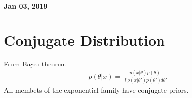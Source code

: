 \documentclass[11pt]{article}
\begin{document}
%

\newcommand{\Ito}{$It\hat{o}$'$s~Lemma$}

\newcommand\ind{\stackrel{\rm ind}{\sim}}
\newcommand\iid{\stackrel{\rm iid}{\sim}}
\renewcommand\c{\mathbf{c}}
\newcommand\y{\mathbf{y}}
\newcommand\z{\mathbf{z}}
\renewcommand\P{\mathbf{P}}
\newcommand\W{\mathbf{W}}
\newcommand\X{\mathbf{X}}
\newcommand\Y{\mathbf{Y}}
\newcommand\Z{\mathbf{Z}}
\newcommand\J{{\cal J}}
\newcommand\B{{\cal B}}
\newcommand\K{{\cal K}}
\newcommand\N{{\rm N}}
\newcommand\bs{\boldsymbol}
\newcommand\bth{\bs\theta}
\newcommand\bbe{\bs\beta}
\renewcommand\*{^\star}

\def\spacingset#1{\renewcommand{\baselinestretch}%
{#1}\small\normalsize} \spacingset{1}



  \bigskip
  \bigskip
  \bigskip
  \begin{center}
    {\LARGE\bf Jan 03, 2019 }
  \end{center}
  \medskip



\spacingset{1.45}







\section{Conjugate Distribution} 

From Bayes theorem
  \begin{align}
    p(\theta | x) = \frac{p(x|\theta)p(\theta)}{\int p(x|\theta')p(\theta')d\theta'}
  \end{align}
All membets of the exponential family have conjugate priors.
\end{document}
